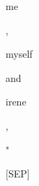 \documentclass[varwidth=150mm]{standalone}
\begin{document}
\begin{CJK*}{UTF8}{gbsn}
{{{\colorbox{red!0.0}{\strut me} \colorbox{red!0.0}{\strut ,} \colorbox{red!0.0}{\strut myself} \colorbox{red!0.0}{\strut and} \colorbox{red!1.9376983642578125}{\strut irene} \colorbox{red!0.0}{\strut ,} \colorbox{red!55.66924285888672}{\strut "} \colorbox{red!9.200204849243164}{\strut [SEP]}
}}}
\end{CJK*}
\end{document}
